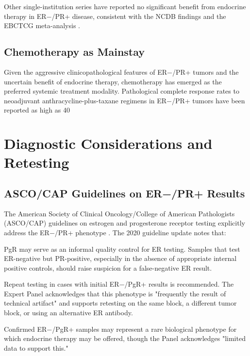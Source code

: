 \documentclass{article}
\begin{document}
Other single-institution series have reported no significant benefit from endocrine therapy in ER−/PR+ disease, consistent with the NCDB findings and the EBCTCG meta-analysis \citep{kunc2018}.

\subsection{Chemotherapy as Mainstay}

Given the aggressive clinicopathological features of ER−/PR+ tumors and the uncertain benefit of endocrine therapy, chemotherapy has emerged as the preferred systemic treatment modality. Pathological complete response rates to neoadjuvant anthracycline-plus-taxane regimens in ER−/PR+ tumors have been reported as high as 40%

\section{Diagnostic Considerations and Retesting}

\subsection{ASCO/CAP Guidelines on ER−/PR+ Results}

The American Society of Clinical Oncology/College of American Pathologists (ASCO/CAP) guidelines on estrogen and progesterone receptor testing explicitly address the ER−/PR+ phenotype \citep{allison2020}. The 2020 guideline update notes that:

PgR may serve as an informal quality control for ER testing. Samples that test ER-negative but PR-positive, especially in the absence of appropriate internal positive controls, should raise suspicion for a false-negative ER result.

Repeat testing in cases with initial ER−/PgR+ results is recommended. The Expert Panel acknowledges that this phenotype is "frequently the result of technical artifact" and supports retesting on the same block, a different tumor block, or using an alternative ER antibody.

Confirmed ER−/PgR+ samples may represent a rare biological phenotype for which endocrine therapy may be offered, though the Panel acknowledges "limited data to support this."
\end{document}

